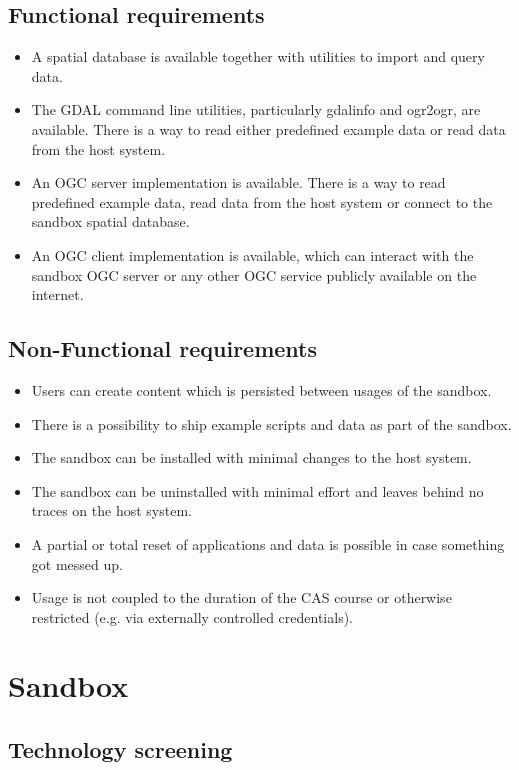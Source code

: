 \documentclass[11pt, a4paper, oneside, parskip=full-]{scrartcl}
\begin{document}
\subsection{Functional requirements}
\begin{itemize}
  \item A spatial database is available together with utilities to import and
  query data.
  \item The GDAL command line utilities, particularly gdalinfo and ogr2ogr, are
  available. There is a way to read either predefined example data or read data
  from the host system.
  \item An OGC server implementation is available. There is a way to read
  predefined example data, read data from the host system or connect to the
  sandbox spatial database.
  \item An OGC client implementation is available, which can interact with the
  sandbox OGC server or any other OGC service publicly available on the
  internet.
\end{itemize}

\subsection{Non-Functional requirements}
\begin{itemize}
  \item Users can create content which is persisted between usages of the
  sandbox.
  \item There is a possibility to ship example scripts and data as part of the
  sandbox.
  \item The sandbox can be installed with minimal changes to the host system.
  \item The sandbox can be uninstalled with minimal effort and leaves behind no
  traces on the host system.
  \item A partial or total reset of applications and data is possible in case
  something got messed up.
  \item Usage is not coupled to the duration of the CAS course or otherwise
  restricted (e.g. via externally controlled credentials).
\end{itemize}

\section{Sandbox}
\subsection{Technology screening}
\end{document}

